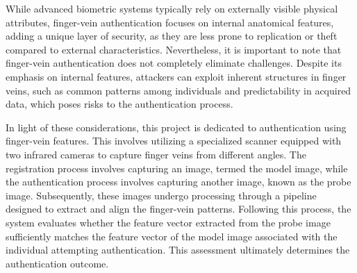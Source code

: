 While advanced biometric systems typically rely on externally visible physical attributes, finger-vein authentication focuses on internal anatomical features, adding a unique layer of security, as they are less prone to replication or theft compared to external characteristics. Nevertheless, it is important to note that finger-vein authentication does not completely eliminate challenges. Despite its emphasis on internal features, attackers can exploit inherent structures in finger veins, such as common patterns among individuals and predictability in acquired data, which poses risks to the authentication process.


In light of these considerations, this project is dedicated to authentication using finger-vein features. This involves utilizing a specialized scanner equipped with two infrared cameras to capture finger veins from different angles. The registration process involves capturing an image, termed the model image, while the authentication process involves capturing another image, known as the probe image. Subsequently, these images undergo processing through a pipeline designed to extract and align the finger-vein patterns. Following this process, the system evaluates whether the feature vector extracted from the probe image sufficiently matches the feature vector of the model image associated with the individual attempting authentication. This assessment ultimately determines the authentication outcome.





